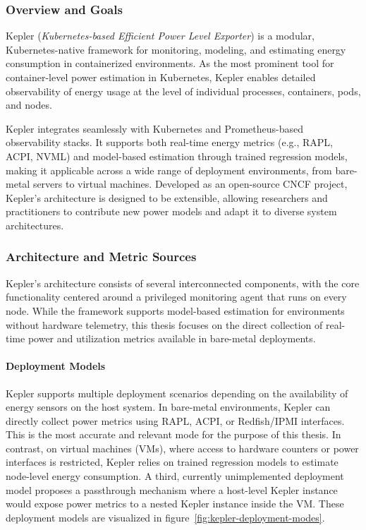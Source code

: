 \subsubsection{Overview and Goals}
\label{sec:kepler-overview}

Kepler (\textit{Kubernetes-based Efficient Power Level Exporter})\parencite{kepler_energy} is a modular, Kubernetes-native framework for monitoring, modeling, and estimating energy consumption in containerized environments. As the most prominent tool for container-level power estimation in Kubernetes, Kepler enables detailed observability of energy usage at the level of individual processes, containers, pods, and nodes\parencite{amaralKeplerFrameworkCalculate2023}.

Kepler integrates seamlessly with Kubernetes and Prometheus-based observability stacks. It supports both real-time energy metrics (e.g., RAPL, ACPI, NVML) and model-based estimation through trained regression models, making it applicable across a wide range of deployment environments, from bare-metal servers to virtual machines. Developed as an open-source CNCF project, Kepler’s architecture is designed to be extensible, allowing researchers and practitioners to contribute new power models and adapt it to diverse system architectures.

\subsubsection{Architecture and Metric Sources}
\label{sec:kepler-architecture}

Kepler's architecture consists of several interconnected components, with the core functionality centered around a privileged monitoring agent that runs on every node. While the framework supports model-based estimation for environments without hardware telemetry, this thesis focuses on the direct collection of real-time power and utilization metrics available in bare-metal deployments.

\paragraph{Deployment Models}
Kepler supports multiple deployment scenarios depending on the availability of energy sensors on the host system. In bare-metal environments, Kepler can directly collect power metrics using RAPL, ACPI, or Redfish/IPMI interfaces. This is the most accurate and relevant mode for the purpose of this thesis. In contrast, on virtual machines (VMs), where access to hardware counters or power interfaces is restricted, Kepler relies on trained regression models to estimate node-level energy consumption. A third, currently unimplemented deployment model proposes a passthrough mechanism where a host-level Kepler instance would expose power metrics to a nested Kepler instance inside the VM. These deployment models are visualized in figure~\ref{fig:kepler-deployment-modes}.

